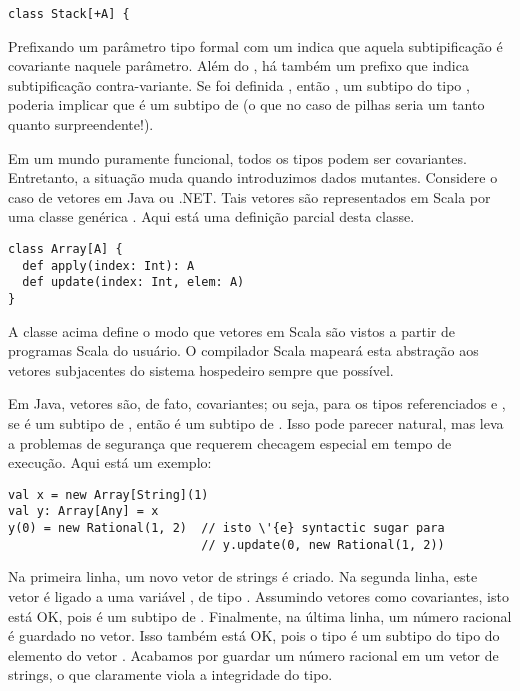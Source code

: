 \begin{lstlisting}
class Stack[+A] {
\end{lstlisting}
Prefixando um parâmetro tipo formal com um \code{+} indica que aquela 
subtipificação é covariante naquele parâmetro. Além do \code{+}, há também um
prefixo \code{-} que indica subtipificação contra-variante. Se 
foi definida , então , um subtipo do tipo
, poderia implicar que  é um subtipo de 
(o que no caso de pilhas seria um tanto quanto surpreendente!). 

Em um mundo puramente funcional, todos os tipos podem ser covariantes. Entretanto, 
a situação muda quando introduzimos dados mutantes. Considere o caso de vetores 
em Java ou .NET. Tais vetores são representados em Scala por uma classe genérica 
. Aqui está uma definição parcial desta classe.
\begin{lstlisting}
class Array[A] {
  def apply(index: Int): A
  def update(index: Int, elem: A)
}
\end{lstlisting}

A classe acima define o modo que vetores em Scala são vistos a partir de programas 
Scala do usuário. O compilador Scala mapeará esta abstração aos vetores subjacentes
do sistema hospedeiro sempre que possível.

Em Java, vetores são, de fato, covariantes; ou seja, para os tipos referenciados  e 
, se  é um subtipo de , então  é um subtipo de 
. Isso pode parecer natural, mas leva a problemas de segurança que requerem
checagem especial em tempo de execução. Aqui está um exemplo: 

\begin{lstlisting}
val x = new Array[String](1)
val y: Array[Any] = x
y(0) = new Rational(1, 2)  // isto \'{e} syntactic sugar para
                           // y.update(0, new Rational(1, 2))
\end{lstlisting}
Na primeira linha, um novo vetor de strings é criado. Na segunda linha, 
este vetor é ligado a uma variável , de tipo . 
Assumindo vetores como covariantes, isto está OK, pois 
é um subtipo de . Finalmente, na última linha, um número 
racional é guardado no vetor. Isso também está OK, pois o tipo  é 
um subtipo do tipo do elemento  do vetor . Acabamos por 
guardar um número racional em um vetor de strings, o que claramente viola
a integridade do tipo.

